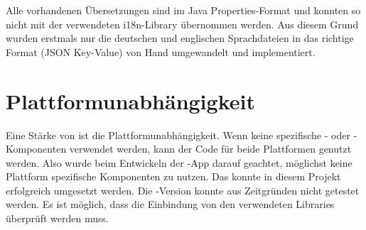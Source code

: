 Alle vorhandenen Übersetzungen sind im Java Properties-Format und konnten so nicht mit der verwendeten i18n-Library übernommen werden. 
Aus diesem Grund wurden erstmals nur die deutschen und englischen Sprachdateien in das richtige Format (JSON Key-Value) von Hand umgewandelt und implementiert.


\section{Plattformunabhängigkeit}
Eine Stärke von  ist die Plattformunabhängigkeit. 
Wenn keine spezifische - oder -Komponenten verwendet werden, kann der Code für beide Plattformen genutzt werden.
Also wurde beim Entwickeln der -App darauf geachtet, möglichst keine Plattform spezifische Komponenten zu nutzen. 
Das konnte in diesem Projekt erfolgreich umgesetzt werden. 
Die -Version konnte aus Zeitgründen nicht getestet werden. 
Es ist möglich, dass die Einbindung von den verwendeten Libraries überprüft werden muss. 
